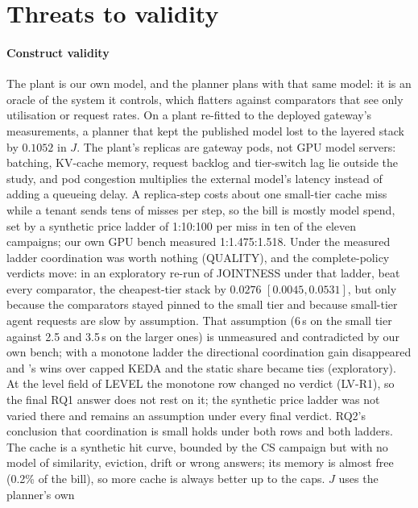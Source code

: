 \section{Threats to validity}
\label{sec:threats}

\paragraph{Construct validity}
The plant is our own model, and the planner plans with that same model:
it is an oracle of the system it controls, which flatters \jcac{} against
comparators that see only utilisation or request rates. On a plant
re-fitted to the deployed gateway's measurements, a planner that kept the
published model lost to the layered stack by $0.1052$ in $J$. The plant's
replicas are gateway pods, not GPU model servers: batching, KV-cache
memory, request backlog and tier-switch lag lie outside the study, and
pod congestion multiplies the external model's latency instead of adding a
queueing delay. A replica-step costs about one small-tier cache miss while
a tenant sends tens of misses per step, so the bill is mostly model spend,
set by a synthetic price ladder of 1:10:100 per miss in ten of the eleven
campaigns; our own GPU bench measured 1:1.475:1.518. Under the measured
ladder coordination was worth nothing (QUALITY), and the complete-policy
verdicts move: in an exploratory re-run of JOINTNESS under that ladder,
\jcac{} beat every comparator, the cheapest-tier stack by $0.0276$
$[0.0045,0.0531]$, but only because the comparators stayed pinned to the
small tier and because small-tier agent requests are slow by assumption.
That assumption (6\,s on the small tier against 2.5 and 3.5\,s on the
larger ones) is unmeasured and contradicted by our own bench; with a
monotone ladder the directional coordination gain disappeared and
\jcac{}'s wins over capped KEDA and the static share became ties
(exploratory). At the level field of LEVEL the monotone row changed no
verdict (LV-R1), so the final RQ1 answer does not rest on it; the
synthetic price ladder was not varied there and remains an assumption under
every final verdict. RQ2's conclusion that coordination is small holds under
both rows and both ladders. The cache is a synthetic hit
curve, bounded by the CS campaign but with no model of similarity,
eviction, drift or wrong answers; its memory is almost free (0.2\% of the
bill), so more cache is always better up to the caps. $J$ uses the planner's own
